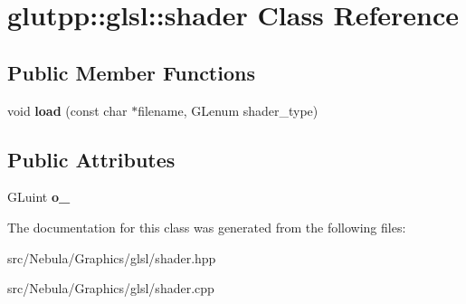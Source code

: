 \hypertarget{classglutpp_1_1glsl_1_1shader}{\section{glutpp\-:\-:glsl\-:\-:shader \-Class \-Reference}
\label{classglutpp_1_1glsl_1_1shader}
}
\subsection*{\-Public \-Member \-Functions}
\begin{DoxyCompactItemize}
\item 
\hypertarget{classglutpp_1_1glsl_1_1shader_a661319769ee74bc8ee182f00083c80ac}{void {\bfseries load} (const char $\ast$filename, \-G\-Lenum shader\-\_\-type)}\label{classglutpp_1_1glsl_1_1shader_a661319769ee74bc8ee182f00083c80ac}

\end{DoxyCompactItemize}
\subsection*{\-Public \-Attributes}
\begin{DoxyCompactItemize}
\item 
\hypertarget{classglutpp_1_1glsl_1_1shader_ad8049417565860b1b5d51171c6ace8dd}{\-G\-Luint {\bfseries o\-\_\-}}\label{classglutpp_1_1glsl_1_1shader_ad8049417565860b1b5d51171c6ace8dd}

\end{DoxyCompactItemize}


\-The documentation for this class was generated from the following files\-:\begin{DoxyCompactItemize}
\item 
src/\-Nebula/\-Graphics/glsl/shader.\-hpp\item 
src/\-Nebula/\-Graphics/glsl/shader.\-cpp\end{DoxyCompactItemize}
